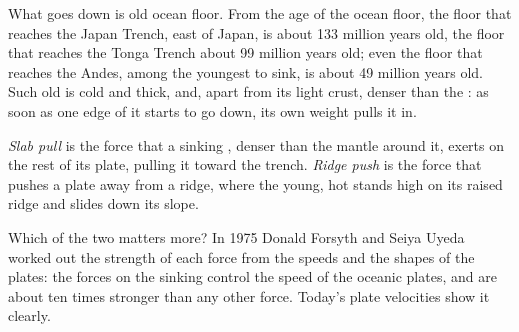 What goes down is old ocean floor. From the age of the ocean floor, the floor
that reaches the Japan Trench, east of Japan, is about 133 million years old,
the floor that reaches the Tonga Trench about 99 million years old; even the
floor that reaches the Andes, among the youngest to sink, is about 49
million years old. Such old  is cold and thick, and, apart from
its light crust, denser than the : as soon as one edge of it
starts to go down, its own weight pulls it in.

\begin{definition}\label{def:g11:subduction-zones:slab-pull}
\emph{Slab pull} is the force that a sinking , denser
than the mantle around it, exerts on the rest of its plate, pulling it toward
the trench. \emph{Ridge push} is the force that pushes a
plate away from a ridge, where the young, hot  stands high on its
raised ridge and slides down its slope.
\end{definition}

Which of the two matters more? In 1975 Donald Forsyth and Seiya Uyeda
worked out the strength of each force from the speeds and the shapes of
the plates: the forces on the sinking  control the speed of the oceanic plates,
and are about ten times stronger than any other force. Today's plate
velocities show it clearly.


